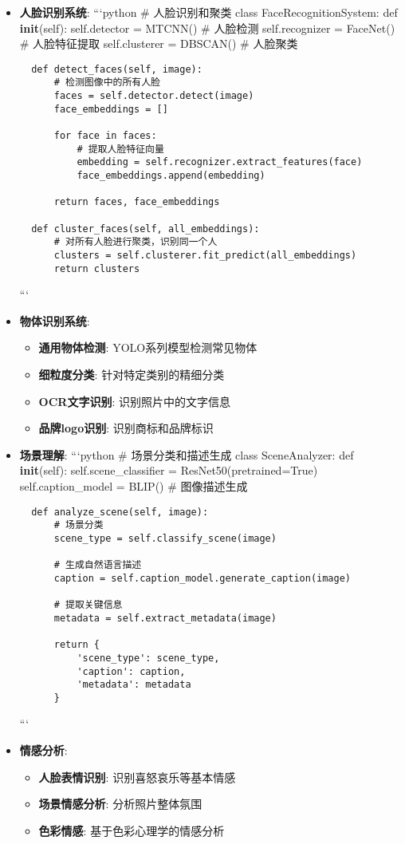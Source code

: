 \begin{itemize}
\item
  \textbf{人脸识别系统}: ```python \# 人脸识别和聚类 class
  FaceRecognitionSystem: def \textbf{init}(self): self.detector =
  MTCNN() \# 人脸检测 self.recognizer = FaceNet() \# 人脸特征提取
  self.clusterer = DBSCAN() \# 人脸聚类

\begin{lstlisting}
  def detect_faces(self, image):
      # 检测图像中的所有人脸
      faces = self.detector.detect(image)
      face_embeddings = []

      for face in faces:
          # 提取人脸特征向量
          embedding = self.recognizer.extract_features(face)
          face_embeddings.append(embedding)

      return faces, face_embeddings

  def cluster_faces(self, all_embeddings):
      # 对所有人脸进行聚类，识别同一个人
      clusters = self.clusterer.fit_predict(all_embeddings)
      return clusters
\end{lstlisting}

  ```
\item
  \textbf{物体识别系统}:

  \begin{itemize}
  \tightlist
  \item
    \textbf{通用物体检测}: YOLO系列模型检测常见物体
  \item
    \textbf{细粒度分类}: 针对特定类别的精细分类
  \item
    \textbf{OCR文字识别}: 识别照片中的文字信息
  \item
    \textbf{品牌logo识别}: 识别商标和品牌标识
  \end{itemize}
\item
  \textbf{场景理解}: ```python \# 场景分类和描述生成 class
  SceneAnalyzer: def \textbf{init}(self): self.scene\_classifier =
  ResNet50(pretrained=True) self.caption\_model = BLIP() \# 图像描述生成

\begin{lstlisting}
  def analyze_scene(self, image):
      # 场景分类
      scene_type = self.classify_scene(image)

      # 生成自然语言描述
      caption = self.caption_model.generate_caption(image)

      # 提取关键信息
      metadata = self.extract_metadata(image)

      return {
          'scene_type': scene_type,
          'caption': caption,
          'metadata': metadata
      }
\end{lstlisting}

  ```
\item
  \textbf{情感分析}:

  \begin{itemize}
  \tightlist
  \item
    \textbf{人脸表情识别}: 识别喜怒哀乐等基本情感
  \item
    \textbf{场景情感分析}: 分析照片整体氛围
  \item
    \textbf{色彩情感}: 基于色彩心理学的情感分析
  \end{itemize}
\end{itemize}

